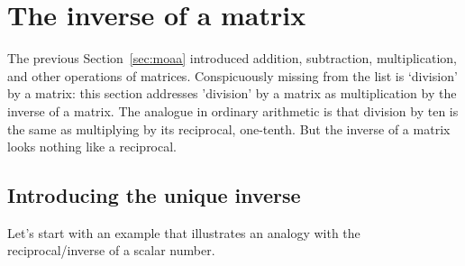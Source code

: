 
\section{The inverse of a matrix}
\label{sec:im}

\secttoc

\begin{comment}
\pooliv{p.163--9}  \layiv{\S2.2--3}  \cite[\S3.2]{Nakos1998}  \cite[Ch.~6]{Chartier2015}
\end{comment}


The previous Section~\ref{sec:moaa} introduced addition, subtraction, multiplication, and other operations of matrices.  
Conspicuously missing from the list is `division' by a matrix: this section addresses 'division' by a matrix as multiplication by the inverse of a matrix.
The analogue in ordinary arithmetic is that division by ten is the same as multiplying by its reciprocal, one-tenth.
But the inverse of a matrix looks nothing like a reciprocal.


\subsection{Introducing the unique inverse}

Let's start with an example that illustrates an analogy with the reciprocal\slash inverse of a scalar number.


